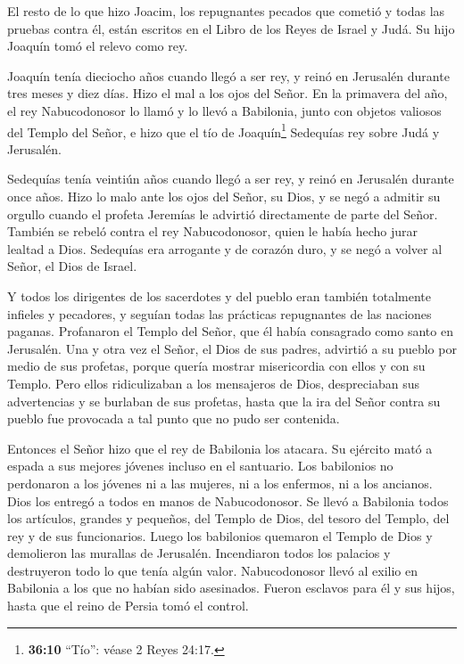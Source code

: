  El resto de lo que hizo Joacim, los repugnantes pecados que
cometió y todas las pruebas contra él, están escritos en el Libro de los
Reyes de Israel y Judá. Su hijo Joaquín tomó el relevo como rey.

 Joaquín tenía dieciocho años cuando llegó a ser rey, y
reinó en Jerusalén durante tres meses y diez días. Hizo el mal a los
ojos del Señor.  En la primavera del año, el rey
Nabucodonosor lo llamó y lo llevó a Babilonia, junto con objetos
valiosos del Templo del Señor, e hizo que el tío de Joaquín\footnote{\textbf{36:10}
  ``Tío'': véase 2 Reyes 24:17.} Sedequías rey sobre Judá y Jerusalén.

 Sedequías tenía veintiún años cuando llegó a ser rey, y
reinó en Jerusalén durante once años.  Hizo lo malo ante
los ojos del Señor, su Dios, y se negó a admitir su orgullo cuando el
profeta Jeremías le advirtió directamente de parte del Señor.
 También se rebeló contra el rey Nabucodonosor, quien le
había hecho jurar lealtad a Dios. Sedequías era arrogante y de corazón
duro, y se negó a volver al Señor, el Dios de Israel.

 Y todos los dirigentes de los sacerdotes y del pueblo eran
también totalmente infieles y pecadores, y seguían todas las prácticas
repugnantes de las naciones paganas. Profanaron el Templo del Señor, que
él había consagrado como santo en Jerusalén.  Una y otra
vez el Señor, el Dios de sus padres, advirtió a su pueblo por medio de
sus profetas, porque quería mostrar misericordia con ellos y con su
Templo.  Pero ellos ridiculizaban a los mensajeros de Dios,
despreciaban sus advertencias y se burlaban de sus profetas, hasta que
la ira del Señor contra su pueblo fue provocada a tal punto que no pudo
ser contenida.

 Entonces el Señor hizo que el rey de Babilonia los
atacara. Su ejército mató a espada a sus mejores jóvenes incluso en el
santuario. Los babilonios no perdonaron a los jóvenes ni a las mujeres,
ni a los enfermos, ni a los ancianos. Dios los entregó a todos en manos
de Nabucodonosor.  Se llevó a Babilonia todos los
artículos, grandes y pequeños, del Templo de Dios, del tesoro del
Templo, del rey y de sus funcionarios.  Luego los
babilonios quemaron el Templo de Dios y demolieron las murallas de
Jerusalén. Incendiaron todos los palacios y destruyeron todo lo que
tenía algún valor.  Nabucodonosor llevó al exilio en
Babilonia a los que no habían sido asesinados. Fueron esclavos para él y
sus hijos, hasta que el reino de Persia tomó el control.

